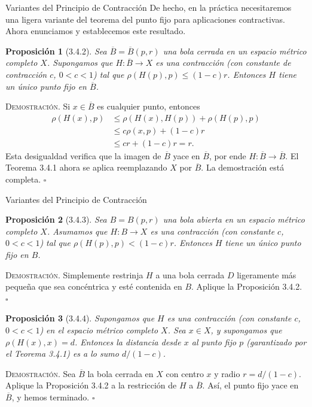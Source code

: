 \documentclass[10pt]{beamer}
\newtheorem{proposicion}{Proposición}
\begin{document}
	\begin{frame}[allowframebreaks]{Variantes del Principio de Contracción}
		De hecho, en la práctica necesitaremos una ligera variante del teorema del punto fijo para aplicaciones contractivas. Ahora enunciamos y establecemos este resultado.
		
		\begin{proposicion}[3.4.2]
			Sea $\overline{B} = \overline{B}(p, r)$ una bola cerrada en un espacio métrico completo $X$. Supongamos que $H : \overline{B} \to X$ es una contracción (con constante de contracción $c$, $0 < c < 1$) tal que $\rho(H(p), p) \leq (1 - c)r$. Entonces $H$ tiene un único punto fijo en $\overline{B}$.
		\end{proposicion}
		
		\textsc{Demostración.} Si $x \in \overline{B}$ es cualquier punto, entonces
		\begin{align*}
			\rho(H(x), p) &\leq \rho(H(x), H(p)) + \rho(H(p), p) \\
			&\leq c\rho(x, p) + (1 - c)r \\
			&\leq cr + (1 - c)r = r.
		\end{align*}
		Esta desigualdad verifica que la imagen de $\overline{B}$ yace en $\overline{B}$, por ende $H : \overline{B} \to \overline{B}$. El Teorema 3.4.1 ahora se aplica reemplazando $X$ por $\overline{B}$. La demostración está completa. \hfill $\square$
	\end{frame}
	
	\begin{frame}{Variantes del Principio de Contracción}
		\begin{proposicion}[3.4.3]
			Sea $B = B(p, r)$ una bola abierta en un espacio métrico completo $X$. Asumamos que $H : B \to X$ es una contracción (con constante $c$, $0 < c < 1$) tal que $\rho(H(p), p) < (1 - c)r$. Entonces $H$ tiene un único punto fijo en $B$.
		\end{proposicion}
		\textsc{Demostración.} Simplemente restrinja $H$ a una bola cerrada $D$ ligeramente más pequeña que sea concéntrica y esté contenida en $B$. Aplique la Proposición 3.4.2. \hfill $\square$
		
		\vspace{0.3cm}
		\begin{proposicion}[3.4.4]
			Supongamos que $H$ es una contracción (con constante $c$, $0 < c < 1$) en el espacio métrico completo $X$. Sea $x \in X$, y supongamos que $\rho(H(x), x) = d$. Entonces la distancia desde $x$ al punto fijo $p$ (garantizado por el Teorema 3.4.1) es a lo sumo $d / (1 - c)$.
		\end{proposicion}
		\textsc{Demostración.} Sea $\overline{B}$ la bola cerrada en $X$ con centro $x$ y radio $r = d / (1 - c)$. Aplique la Proposición 3.4.2 a la restricción de $H$ a $\overline{B}$. Así, el punto fijo yace en $\overline{B}$, y hemos terminado. \hfill $\square$
	\end{frame}
	
\end{document}
